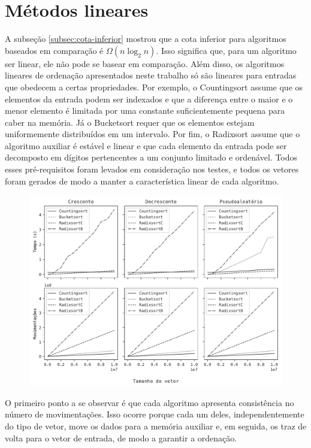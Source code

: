 \section{Métodos lineares}
A subseção \ref{subsec:cota-inferior} mostrou que a cota inferior para algoritmos baseados em comparação é $\Omega(n\log_2n)$. Isso significa que, para um algoritmo ser linear, ele não pode se basear em comparação. Além disso, os algoritmos lineares de ordenação apresentados neste trabalho só são lineares para entradas que obedecem a certas propriedades. Por exemplo, o Countingsort assume que os elementos da entrada podem ser indexados e que a diferença entre o maior e o menor elemento é limitada por uma constante suficientemente pequena para caber na memória. Já o Bucketsort requer que os elementos estejam uniformemente distribuídos em um intervalo. Por fim, o Radixsort assume que o algoritmo auxiliar é estável e linear e que cada elemento da entrada pode ser decomposto em dígitos pertencentes a um conjunto limitado e ordenável. Todos esses pré-requisitos foram levados em consideração nos testes, e todos os vetores foram gerados de modo a manter a característica linear de cada algoritmo.

\begin{figure}[H]
\centering
\includegraphics[scale=0.787]{figuras/pdf/lineares.pdf}
\end{figure}

O primeiro ponto a se observar é que cada algoritmo apresenta consistência no número de movimentações. Isso ocorre porque cada um deles, independentemente do tipo de vetor, move os dados para a memória auxiliar e, em seguida, os traz de volta para o vetor de entrada, de modo a garantir a ordenação.

